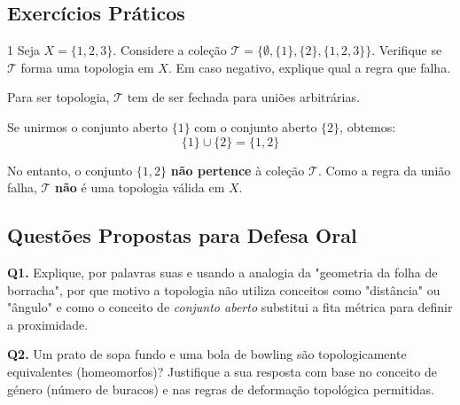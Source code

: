 \subsection{Exercícios Práticos}

\begin{exercisebox}{1}
  Seja $X = \{1, 2, 3\}$. Considere a coleção $\mathcal{T} = \{\emptyset, \{1\}, \{2\}, \{1, 2, 3\}\}$. Verifique se $\mathcal{T}$ forma uma topologia em $X$. Em caso negativo, explique qual a regra que falha.
\end{exercisebox}
\begin{solbox}
  Para ser topologia, $\mathcal{T}$ tem de ser fechada para uniões arbitrárias. 
  
  Se unirmos o conjunto aberto $\{1\}$ com o conjunto aberto $\{2\}$, obtemos:
  \[ \{1\} \cup \{2\} = \{1, 2\} \]
  
  No entanto, o conjunto $\{1, 2\}$ \textbf{não pertence} à coleção $\mathcal{T}$. Como a regra da união falha, $\mathcal{T}$ \textbf{não} é uma topologia válida em $X$.
\end{solbox}

\subsection{Questões Propostas para Defesa Oral}

\begin{oralbox}
  \textbf{Q1.} Explique, por palavras suas e usando a analogia da "geometria da folha de borracha", por que motivo a topologia não utiliza conceitos como "distância" ou "ângulo" e como o conceito de \emph{conjunto aberto} substitui a fita métrica para definir a proximidade.
\end{oralbox}

\begin{oralbox}
  \textbf{Q2.} Um prato de sopa fundo e uma bola de bowling são topologicamente equivalentes (homeomorfos)? Justifique a sua resposta com base no conceito de género (número de buracos) e nas regras de deformação topológica permitidas.
\end{oralbox}